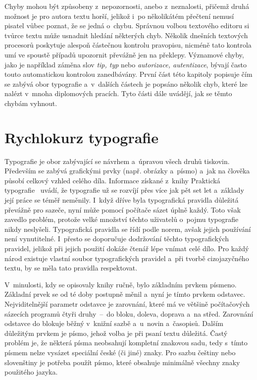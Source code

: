 Chyby mohou být způsobeny z~nepozornosti, anebo z~neznalosti, přičemž druhá možnost
je pro autora textu horší, jelikož i~po několikátém přečtení nemusí pisatel vůbec
poznat, že se jedná o~chybu. Správnou volbou textového editoru si tvůrce textu
může usnadnit hledání některých chyb. Několik dnešních textových procesorů poskytuje
alespoň částečnou kontrolu pravopisu, nicméně tato kontrola umí ve spoustě případů
upozornit převážně jen na překlepy. Významové chyby, jako je například záměna slov
\emph{tip, typ} nebo \emph{autorizace, autentizace}, bývají často touto
automatickou kontrolou zanedbávány. První část této kapitoly popisuje
čím se zabývá obor typografie a~v~dalších částech je popsáno několik
chyb, které lze nalézt v~mnoha diplomových pracích. Tyto části dále uvádějí,
jak se těmto chybám vyhnout.


\section{Rychlokurz typografie}
Typografie je obor zabývající se návrhem a~úpravou všech druhů tiskovin.
Především se zabývá grafickými prvky (např. obrázky a~písmo) a~jak na člověka
působí celkový vzhled celého díla.
Informace získané z~knihy Praktická typografie~\cite{Prakticka_typografie}
uvádí, že typografie už se rozvíjí přes více jak pět set
let a~základy její práce se téměř neměnily. I~když dříve byla typografická
pravidla důležitá převážně pro sazeče, nyní může pomocí počítače sázet
úplně každý. Toto však zavedlo problém, protože velké množství těchto
uživatelů o~pojmu typografie nikdy neslyšeli. Typografická pravidla se řídí podle
norem, avšak jejich používání není vynutitelné. I~přesto se doporučuje
dodržování těchto typografických pravidel, jelikož při jejich použití
dokáže čtenář lépe vnímat celé dílo. Pro každý národ existuje vlastní
soubor typografických pravidel a~při tvorbě cizojazyčného textu, by se
měla tato pravidla respektovat.

V~minulosti, kdy se opisovaly knihy ručně, bylo základním prvkem písmeno. 
Základní prvek se od té doby postupně měnil a~nyní je tímto prvkem odstavec.
Nejviditelnější parametr odstavce je zarovnání, které má ve většině 
počítačových sázecích programů čtyři druhy~--~do bloku, doleva, doprava 
a~na střed. Zarovnání odstavce do blokuje běžný v~knižní sazbě a~u~novin
a~časopisů. Dalším důležitým prvkem je písmo, jehož volba je při psaní textu
důležitá. Častý problém je, že některá písma neobsahují kompletní znakovou
sadu, tedy s~tímto písmem nelze vysázet speciální české (či jiné) znaky.
Pro sazbu češtiny nebo slovenštiny je potřeba použít písmo, které obsahuje
minimálně všechny znaky použitého jazyka.


